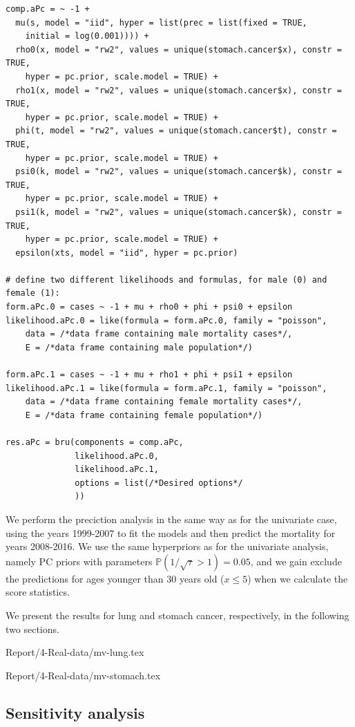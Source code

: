 \begin{verbatim}
comp.aPc = ~ -1 + 
  mu(s, model = "iid", hyper = list(prec = list(fixed = TRUE,
    initial = log(0.001)))) +
  rho0(x, model = "rw2", values = unique(stomach.cancer$x), constr = TRUE,
    hyper = pc.prior, scale.model = TRUE) + 
  rho1(x, model = "rw2", values = unique(stomach.cancer$x), constr = TRUE,
    hyper = pc.prior, scale.model = TRUE) + 
  phi(t, model = "rw2", values = unique(stomach.cancer$t), constr = TRUE,
    hyper = pc.prior, scale.model = TRUE) + 
  psi0(k, model = "rw2", values = unique(stomach.cancer$k), constr = TRUE,
    hyper = pc.prior, scale.model = TRUE) + 
  psi1(k, model = "rw2", values = unique(stomach.cancer$k), constr = TRUE,
    hyper = pc.prior, scale.model = TRUE) + 
  epsilon(xts, model = "iid", hyper = pc.prior)

# define two different likelihoods and formulas, for male (0) and female (1):
form.aPc.0 = cases ~ -1 + mu + rho0 + phi + psi0 + epsilon
likelihood.aPc.0 = like(formula = form.aPc.0, family = "poisson",
    data = /*data frame containing male mortality cases*/,
    E = /*data frame containing male population*/)

form.aPc.1 = cases ~ -1 + mu + rho1 + phi + psi1 + epsilon
likelihood.aPc.1 = like(formula = form.aPc.1, family = "poisson",
    data = /*data frame containing female mortality cases*/,
    E = /*data frame containing female population*/)

res.aPc = bru(components = comp.aPc,
              likelihood.aPc.0,
              likelihood.aPc.1,
              options = list(/*Desired options*/
              )) 
\end{verbatim}
\newpar We perform the preciction analysis in the same way as for the univariate case, using the years 1999-2007 to fit the models and then predict the mortality for years 2008-2016. We use the same hyperpriors as for the univariate analysis, namely PC priors with parameters $\mathbb{P}(1/\sqrt{\tau} > 1) = 0.05$, and we gain exclude the predictions for ages younger than 30 years old ($x \leq 5$) when we calculate the score statistics.

We present the results for lung and stomach cancer, respectively, in the following two sections.

{Report/4-Real-data/mv-lung.tex}

{Report/4-Real-data/mv-stomach.tex}

\newpage
\subsection{Sensitivity analysis}

